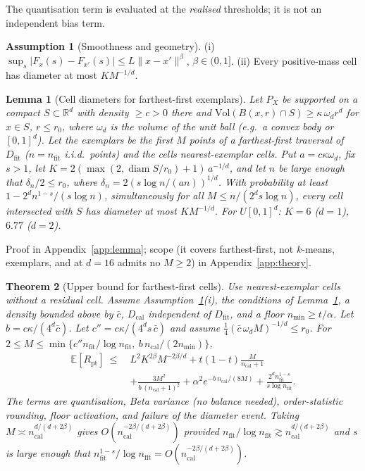 \documentclass[twoside]{article}
\newtheorem{theorem}{Theorem}
\newtheorem{lemma}[theorem]{Lemma}
\theoremstyle{definition}
\newtheorem{assumption}{Assumption}
\theoremstyle{remark}
\newcommand{\Dfit}{D_{\mathrm{fit}}}
\newcommand{\Dcal}{D_{\mathrm{cal}}}
\newcommand{\E}{\mathbb{E}}
\newcommand{\1}{\mathbf{1}}
\DeclareMathOperator{\diam}{diam}
\begin{document}
The quantisation term is evaluated at the \emph{realised} thresholds; it is not an
independent bias term.

\begin{assumption}[Smoothness and geometry]
\label{ass:B}
(i) $\sup_s |F_x(s)-F_{x'}(s)| \le L\|x-x'\|^\beta$, $\beta\in(0,1]$.
(ii) Every positive-mass cell has diameter at most $K M^{-1/d}$.
\end{assumption}

\begin{lemma}[Cell diameters for farthest-first exemplars]
\label{lem:diam}
Let $P_X$ be supported on a compact $S\subset\mathbb R^d$ with density $\ge c>0$ there and
$\mathrm{Vol}(B(x,r)\cap S)\ge\kappa\,\omega_d r^d$ for $x\in S$, $r\le r_0$, where $\omega_d$ is the volume of the unit ball (e.g.\ a convex body
or $[0,1]^d$). Let the exemplars be the first $M$ points of a farthest-first traversal of $\Dfit$
($n=n_{\mathrm{fit}}$ i.i.d.\ points) and the cells nearest-exemplar cells. Put
$a=c\kappa\omega_d$, fix $s>1$, let $K=2(\max(2,\diam S/r_0)+1)\,a^{-1/d}$, and let $n$ be large enough
that $\delta_n/2\le r_0$, where $\delta_n=2(s\log n/(an))^{1/d}$. With probability at
least $1-2^d n^{1-s}/(s\log n)$, simultaneously for all $M\le n/(2^d s\log n)$, every cell intersected with $S$ has
diameter at most $KM^{-1/d}$. For $U[0,1]^d$: $K=6$ ($d=1$), $6.77$ ($d=2$).
\end{lemma}
Proof in Appendix~\ref{app:lemma}; scope (it covers farthest-first, not $k$-means, exemplars, and at
$d=16$ admits no $M\ge2$) in Appendix~\ref{app:theory}.

\begin{theorem}[Upper bound for farthest-first cells]
\label{thm:B}
Use nearest-exemplar cells without a residual cell. Assume Assumption~\ref{ass:B}(i), the conditions of Lemma~\ref{lem:diam}, a density bounded
above by $\bar c$, $\Dcal$ independent of $\Dfit$, and a floor $n_{\min}\ge t/\alpha$. Let
$b=c\kappa/(4^d\bar c)$. Let $c''=c\kappa/(4^d s\,\bar c)$ and assume $\tfrac14(\bar c\,\omega_d M)^{-1/d}\le r_0$. For
$2\le M\le\min\{c''n_{\mathrm{fit}}/\log n_{\mathrm{fit}},\
b\,n_{\mathrm{cal}}/(2n_{\min})\}$,
\begin{align*}
  \E[R_{\mathrm{pt}}]\ \le\ &L^2K^{2\beta}M^{-2\beta/d} + t(1-t)\frac{M}{n_{\mathrm{cal}}+1}\\
  &+ \frac{3M^2}{b\,(n_{\mathrm{cal}}+1)^2} + \alpha^2 e^{-b\,n_{\mathrm{cal}}/(8M)}
  + \frac{2^d n_{\mathrm{fit}}^{1-s}}{s\log n_{\mathrm{fit}}}.
\end{align*}
The terms are quantisation, Beta variance (no balance needed), order-statistic rounding, floor
activation, and failure of the diameter event. Taking $M\asymp n_{\mathrm{cal}}^{d/(d+2\beta)}$ gives
$O(n_{\mathrm{cal}}^{-2\beta/(d+2\beta)})$ provided $n_{\mathrm{fit}}/\log n_{\mathrm{fit}}\gtrsim
n_{\mathrm{cal}}^{d/(d+2\beta)}$ and $s$ is large enough that $n_{\mathrm{fit}}^{1-s}/\log n_{\mathrm{fit}}=
O(n_{\mathrm{cal}}^{-2\beta/(d+2\beta)})$.
\end{theorem}
\end{document}
